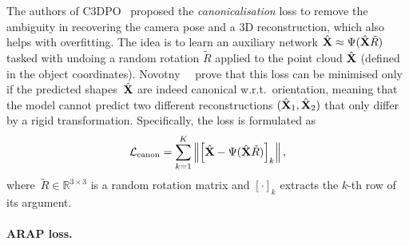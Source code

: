 The authors of C3DPO~\cite{novotny19c3dpo} proposed the \emph{canonicalisation} loss to remove the ambiguity in recovering the camera pose and a 3D reconstruction, which also helps with overfitting.
The idea is to learn an auxiliary network $\hat {\mathbf{X}} \approx \Psi(\hat{\mathbf{X}}\tilde{R})$ tasked with undoing a random rotation $\tilde{R}$ applied to the point cloud $\hat{\mathbf{X}}$ (defined in the object coordinates).
Novotny~\etal~\cite{novotny19c3dpo} prove that this loss can be minimised only if the predicted shapes~$\hat{\mathbf{X}}$ are indeed canonical w.r.t.~orientation, meaning that the model cannot predict two different reconstructions $(\hat{\mathbf{X}}_1, \hat{\mathbf{X}}_2)$ that only differ by a rigid transformation.
Specifically, the loss is formulated as
\begin{equation}\label{e:canon}
\mathcal{L}_\text{canon}
=
\sum_{k=1}^K 
\left \|
\left[\hat{\mathbf{X}} - \Psi(\hat{\mathbf{X}} \tilde{R}) \right]_k
\right \|,
\end{equation}
where~$\tilde{R} \in \mathbb{R}^{3 \times 3}$ is a random rotation matrix and $[\cdot]_k$ extracts the $k$-th row of its argument.


\paragraph{ARAP loss.}

